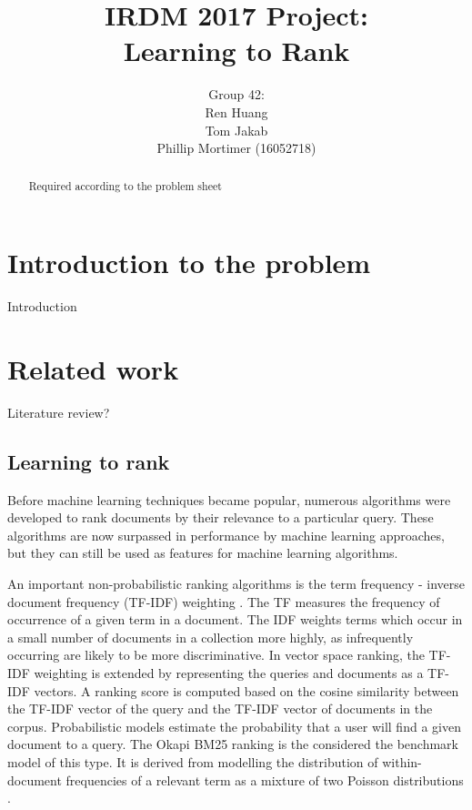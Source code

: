 \documentclass[english]{article}
\theoremstyle{definition}
\begin{document}
\title{IRDM 2017 Project:\\Learning to Rank
}
\author{Group 42:\\
Ren Huang \\
Tom Jakab\\
Phillip Mortimer (16052718)}
\maketitle
\begin{abstract}
Required according to the problem sheet
\end{abstract}

\section{Introduction to the problem}

Introduction

\section{Related work}

Literature review?

\subsection{Learning to rank}

Before machine learning techniques became popular, numerous algorithms were developed to rank documents by their relevance to a particular query.  These algorithms are now surpassed in performance by machine learning approaches, but they can still be used as features for machine learning algorithms. 

An important non-probabilistic ranking algorithms is the term frequency - inverse document frequency (TF-IDF) weighting \cite{tfidf}.  The TF measures the frequency of occurrence of a given term in a document.  The IDF weights terms which occur in a small number of documents in a collection more highly, as infrequently occurring are likely to be more discriminative.  In vector space ranking, the TF-IDF weighting is extended by representing the queries and documents as a TF-IDF vectors.   A ranking score is computed based on the cosine similarity between the TF-IDF vector of the query and the TF-IDF vector of documents in the corpus.  Probabilistic models estimate the probability that a user will find a given document to a query.  The Okapi BM25 ranking is the considered the benchmark model of this type.  It is derived from modelling the distribution of within-document frequencies of a relevant
term as a mixture of two Poisson distributions \cite{robertson1993okapi}.
\end{document}
